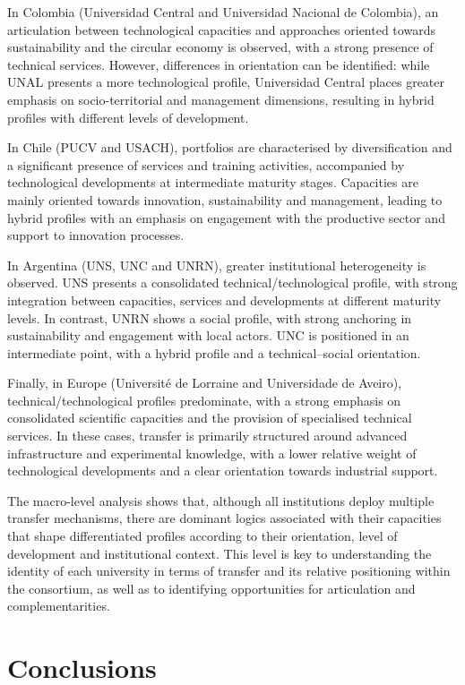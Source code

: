 \documentclass[
  12pt,
  oneside]{book}
\begin{document}
In Colombia (Universidad Central and Universidad Nacional de Colombia),
an articulation between technological capacities and approaches oriented
towards sustainability and the circular economy is observed, with a
strong presence of technical services. However, differences in
orientation can be identified: while UNAL presents a more technological
profile, Universidad Central places greater emphasis on
socio-territorial and management dimensions, resulting in hybrid
profiles with different levels of development.

In Chile (PUCV and USACH), portfolios are characterised by
diversification and a significant presence of services and training
activities, accompanied by technological developments at intermediate
maturity stages. Capacities are mainly oriented towards innovation,
sustainability and management, leading to hybrid profiles with an
emphasis on engagement with the productive sector and support to
innovation processes.

In Argentina (UNS, UNC and UNRN), greater institutional heterogeneity is
observed. UNS presents a consolidated technical/technological profile,
with strong integration between capacities, services and developments at
different maturity levels. In contrast, UNRN shows a social profile,
with strong anchoring in sustainability and engagement with local
actors. UNC is positioned in an intermediate point, with a hybrid
profile and a technical--social orientation.

Finally, in Europe (Université de Lorraine and Universidade de Aveiro),
technical/technological profiles predominate, with a strong emphasis on
consolidated scientific capacities and the provision of specialised
technical services. In these cases, transfer is primarily structured
around advanced infrastructure and experimental knowledge, with a lower
relative weight of technological developments and a clear orientation
towards industrial support.

The macro-level analysis shows that, although all institutions deploy
multiple transfer mechanisms, there are dominant logics associated with
their capacities that shape differentiated profiles according to their
orientation, level of development and institutional context. This level
is key to understanding the identity of each university in terms of
transfer and its relative positioning within the consortium, as well as
to identifying opportunities for articulation and complementarities.

\chapter{Conclusions}\label{conclusions}
\end{document}
